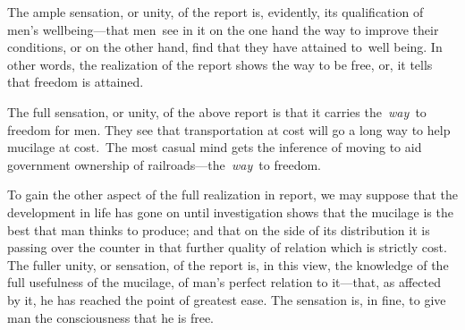 \documentclass[openany,nobib]{tufte-book}
\begin{document}
The ample sensation, or unity, of the report is, evidently, its
qualification of men's wellbeing---that men~see in it on the one hand
the way to improve their conditions, or on the other hand, find that
they have attained to~well being. In other words, the realization of the
report shows the way to be free, or, it tells that freedom is attained.~

The full sensation, or unity, of the above report is that it carries
the~\emph{way~}to freedom for men. They see that transportation at cost
will go a long way to help mucilage at cost.~The most casual mind gets
the inference of moving to aid government ownership of
railroads---the\emph{~way~}to freedom.~

To gain the other aspect of the full realization in report, we may
suppose that the development in life has gone on until investigation
shows that the mucilage is the best that man thinks to produce; and that
on the side of its distribution it is passing over the counter in that
further quality of relation which is strictly cost. The fuller unity, or
sensation, of the report is, in this view, the knowledge of the full
usefulness of the mucilage, of man's perfect relation to it---that, as
affected by it, he has reached the point of greatest ease. The sensation
is, in fine, to give man the consciousness that he is free.~
\end{document}
